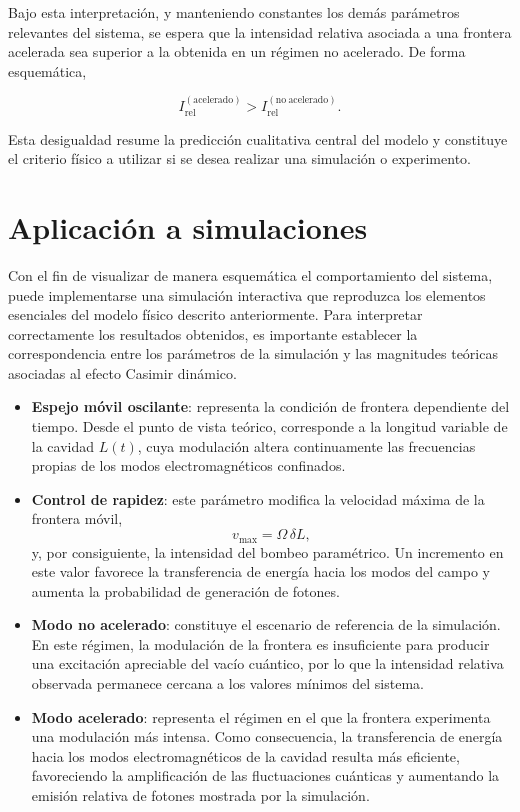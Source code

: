 \documentclass[11pt,a4paper]{article}
\begin{document}
Bajo esta interpretación, y manteniendo constantes los demás parámetros relevantes del sistema, se espera que la intensidad relativa asociada a una frontera acelerada sea superior a la obtenida en un régimen no acelerado. De forma esquemática,

\begin{equation}
I_{\mathrm{rel}}^{(\mathrm{acelerado})}
>
I_{\mathrm{rel}}^{(\mathrm{no\ acelerado})}.
\end{equation}

Esta desigualdad resume la predicción cualitativa central del modelo y constituye el criterio físico a utilizar si se desea realizar una simulación o experimento. 

\section{Aplicación a simulaciones}

Con el fin de visualizar de manera esquemática el comportamiento del sistema, puede implementarse una simulación interactiva que reproduzca los elementos esenciales del modelo físico descrito anteriormente. Para interpretar correctamente los resultados obtenidos, es importante establecer la correspondencia entre los parámetros de la simulación y las magnitudes teóricas asociadas al efecto Casimir dinámico.

\begin{itemize}

\item \textbf{Espejo móvil oscilante}: representa la condición de frontera dependiente del tiempo. Desde el punto de vista teórico, corresponde a la longitud variable de la cavidad $L(t)$, cuya modulación altera continuamente las frecuencias propias de los modos electromagnéticos confinados.

\item \textbf{Control de rapidez}: este parámetro modifica la velocidad máxima de la frontera móvil,
\begin{equation}
v_{\max}=\Omega\,\delta L,
\end{equation}
y, por consiguiente, la intensidad del bombeo paramétrico. Un incremento en este valor favorece la transferencia de energía hacia los modos del campo y aumenta la probabilidad de generación de fotones.

\item \textbf{Modo no acelerado}: constituye el escenario de referencia de la simulación. En este régimen, la modulación de la frontera es insuficiente para producir una excitación apreciable del vacío cuántico, por lo que la intensidad relativa observada permanece cercana a los valores mínimos del sistema.

\item \textbf{Modo acelerado}: representa el régimen en el que la frontera experimenta una modulación más intensa. Como consecuencia, la transferencia de energía hacia los modos electromagnéticos de la cavidad resulta más eficiente, favoreciendo la amplificación de las fluctuaciones cuánticas y aumentando la emisión relativa de fotones mostrada por la simulación.

\end{itemize}
\end{document}
